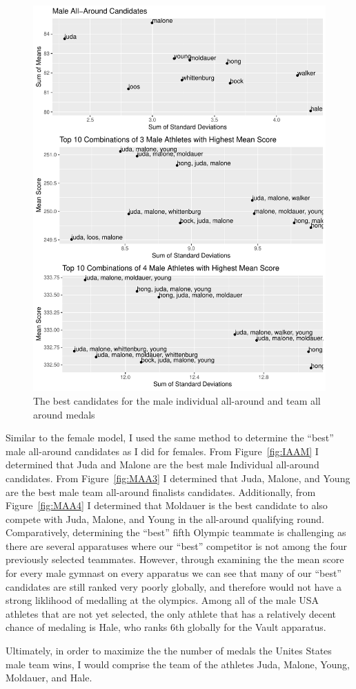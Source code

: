 \documentclass[12pt]{article}
\begin{document}
\begin{figure}
  \centering
  \includegraphics[scale=0.7]{MaleMultipleAllAround.pdf}
  \caption{The best candidates for the male individual all-around and team all around medals}
  \label{fig:FAA}
\end{figure}


Similar to the female model, I used the same method to determine the ``best'' male all-around candidates as I did for females. From 
Figure~\ref{fig:IAAM} I determined that Juda and Malone are the best male Individual all-around candidates. From 
Figure~\ref{fig:MAA3} I determined that Juda, Malone, and Young are the best male team all-around finalists 
candidates. Additionally, from Figure~\ref{fig:MAA4} I determined that Moldauer is the best candidate to also compete 
with Juda, Malone, and Young in the all-around qualifying round. Comparatively, determining the ``best'' fifth Olympic 
teammate is challenging as there are several apparatuses where our ``best'' competitor is not among the four 
previously selected teammates. However, through examining the the mean score for every male gymnast on every apparatus 
we can see that many of our ``best'' candidates are still ranked very poorly globally, and therefore would not have a 
strong liklihood of medalling at the olympics. Among all of the male USA athletes that are not yet selected, the only 
athlete that has a relatively decent chance of medaling is Hale, who ranks 6th globally for the Vault apparatus.

Ultimately, in order to maximize the the number of medals the Unites States male team wins, I would comprise the 
team of the athletes Juda, Malone, Young, Moldauer, and Hale.



\end{document}
